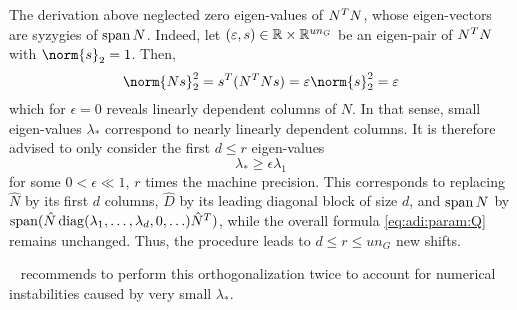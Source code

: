 The derivation above neglected zero eigen-values of $N^T N$,
whose eigen-vectors are syzygies of $\operatorname{span} N$.
Indeed, let $(\varepsilon,s)\in\mathbb{R}\times\mathbb{R}^{un_G}$ be an eigen-pair of $N^T N$ with $\norm{s}_2 = 1$.
Then,
\begin{equation}
  \norm{Ns}_2^2
  = s^\T (N^\T N s)
  = \epsilon\norm{s}_2^2
  = \epsilon
\end{equation}
which for $\epsilon=0$ reveals linearly dependent columns of $N$.
In that sense, small eigen-values $\lambda_*$ correspond to nearly linearly dependent columns.
It is therefore advised to only consider the first $d \leq r$ eigen-values
\begin{equation}
  \lambda_* \geq \epsilon \lambda_1
\end{equation}
for some $0 < \epsilon \ll 1$, \eg $r$ times the machine precision.
This corresponds to replacing
$\hat N$ by its first $d$ columns,
$\hat D$ by its leading diagonal block of size $d$,
and $\operatorname{span} N$ by $\operatorname{span}(\hat N \operatorname{diag}(\lambda_1, \ldots, \lambda_d, 0, \ldots) \hat N^T)$,
while the overall formula \eqref{eq:adi:param:Q} remains unchanged.
Thus, the procedure leads to $d \leq r \leq un_G$ new shifts.

\citeauthor{Kuerschner2016}~\cite{Kuerschner2016} recommends to perform this orthogonalization twice
to account for numerical instabilities caused by very small $\lambda_*$.



